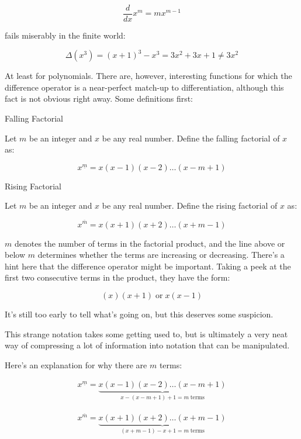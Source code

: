 \documentclass{standalone}
\begin{document}
\[
  \frac d {dx} x^m = mx^{m-1}
\]

fails miserably in the finite world:

\[
  \Delta(x^3) = (x + 1)^3 - x^3 = 3x^2 + 3x + 1 \neq 3x^2
\]

At least for polynomials. There are, however, interesting functions for which
the difference operator is a near-perfect match-up to differentiation, although
this fact is not obvious right away. Some definitions first:

\begin{definition}
  Falling Factorial

  Let $m$ be an integer and $x$ be any real number. Define the falling factorial
  of $x$ as:

  \[
    x^{\underline{m}} = x(x-1)(x-2)\dots(x-m+1)
  \]
\end{definition}

\begin{definition}
  Rising Factorial

  Let $m$ be an integer and $x$ be any real number. Define the rising factorial
  of $x$ as:

  \[
    x^{\overline{m}} = x(x+1)(x+2)\dots(x+m-1)
  \]
\end{definition}

$m$ denotes the number of terms in the factorial product, and the line above or
below $m$ determines whether the terms are increasing or decreasing. There's a
hint here that the difference operator might be important. Taking a peek at the
first two consecutive terms in the product, they have the form:

\[
  (x)(x+1) \; \text{or} \; x(x-1)
\]

It's still too early to tell what's going on, but this deserves some suspicion.

This strange notation takes some getting used to, but is ultimately a very neat
way of compressing a lot of information into notation that can be manipulated.

Here's an explanation for why there are $m$ terms:

\begin{align*}
  x^{\underline{m}} = \underbrace{x(x-1)(x-2)\dots(x-m+1)}_{x - (x - m + 1) + 1 = m \; \text{terms}}
\end{align*}

\begin{align*}
  x^{\overline{m}} = \underbrace{x(x+1)(x+2)\dots(x+m-1)}_{(x + m - 1) - x + 1 = m \; \text{terms}}
\end{align*}
\end{document}
